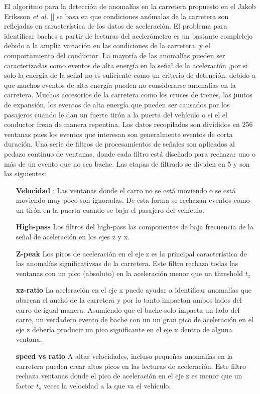 El algoritmo para la detección de anomalías en la carretera propuesto en el Jakob Eriksson {\it et al.} [] se basa en que condiciones anómalas de la carretera
son reflejadas en característica de los datos de aceleración. El problema para identificar baches a partir de lecturas del acelerómetro es un bastante 
complelejo debido a la amplia variación en las condiciones de la carretera. y el comportamiento del conductor. La mayoría de las anomalías pueden ser 
caracterizadas como eventos de alta energía en la señal de la aceleración ,por si solo la energía de la señal no es suficiente como un criterio de 
detención, debido a que muchos eventos de alta energía pueden no considerarse anomalías en la carretera. Muchos accesorios de la carretera como 
los cruces de trenes, las juntos de expansión, los eventos de alta energía que pueden ser causados por los pasajeros cuando le dan un fuerte 
tirón a la puerta del vehículo o si el el conductor frena de manera repentina. Los datos recopilados son divididos en 256 ventanas pues 
los eventos que interesan son generalmente eventos de corta duración. Una serie de filtros de procesamientos de señales son aplicados 
al  pedazo continuo de ventanas, donde cada filtro está diseñado para rechazar uno o más de un evento que no sea bache. 
Las etapas de filtrado se dividen en 5 y son las siguientes:

\begin{enumerate}
	\item [ \textbf {Velocidad}]: Las ventanas donde el carro no se está moviendo o se está moviendo muy poco son ignoradas. 
	De esta forma se rechazan eventos como un tirón en la puerta  cuando se baja el pasajero del vehículo.\\
	\item [ \textbf {High-pass}] Los filtros del high-pass las componentes de baja frecuencia de la señal de aceleración  en los ejes z y x.
	\item  [ \textbf {Z-peak}] Los picos de aceleración en el eje z es la principal característica de las anomalías significativsas de la carretera.
	Este filtro rechaza todas las ventanas con un pico (absoluto) en la aceleración menor que un threshold $t_z$
	\item  [ \textbf {xz-ratio }] La aceleración en el eje x puede ayudar a identificar anomalías que abarcan el ancho de la carretera y por lo tanto 
	impactan ambos lados del carro de igual manera.  Asumiendo que el bache solo impacta un lado del carro, un verdadero evento de bache con un
	un gran pico de aceleración en el eje z debería producir  un pico significante en el eje x  dentro de alguna ventana.
	\item  [ \textbf {speed vs ratio }] A altas velocidades, incluso pequeñas anomalías en la carretera pueden crear altos picos en las lecturas 
	de aceleración. Este filtro rechaza ventanas donde el pico de aceleración en el eje z es menor que un factor $t_s$ veces la velocidad a la que 
	va el vehículo.
\end{enumerate}



